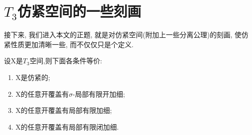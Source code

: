\chapter{$T_3$仿紧空间的一些刻画}
\label{chap03}

接下来, 我们进入本文的正题, 就是对仿紧空间(附加上一些分离公理)的刻画,
使仿紧性质更加清晰一些, 而不仅仅只是个定义.

\begin{thm} \label{thm:paracompact sigma finite}
  设X是$T_3$空间,则下面各条件等价:
  \begin{enumerate}
  \item X是仿紧的;
  \item X的任意开覆盖有$\sigma$-局部有限开加细;
  \item X的任意开覆盖有局部有限加细;
  \item X的任意开覆盖有局部有限闭加细.
  \end{enumerate}
\end{thm}
